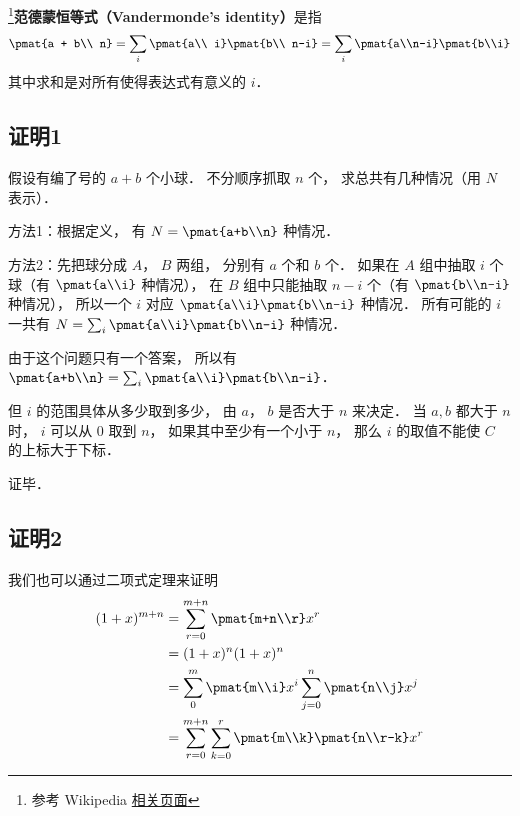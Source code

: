 

\footnote{参考 Wikipedia \href{https://en.wikipedia.org/wiki/Vandermonde's_identity}{相关页面}}\textbf{范德蒙恒等式（Vandermonde's identity）}是指
\begin{equation}
\pmat{a + b\\ n} = \sum_i \pmat{a\\ i} \pmat{b\\ n-i} = \sum\limits_i \pmat{a\\n-i}\pmat{b\\i}
\end{equation}
其中求和是对所有使得表达式有意义的 $i$．

\subsection{证明1}

假设有编了号的 $a+b$ 个小球． 不分顺序抓取 $n$ 个， 求总共有几种情况（用 $N$ 表示）．

方法1：根据定义， 有 $N = \pmat{a+b\\n}$ 种情况．

方法2：先把球分成 $A$，  $B$ 两组， 分别有 $a$ 个和 $b$ 个． 如果在 $A$ 组中抽取 $i$ 个球（有 $\pmat{a\\i}$ 种情况）， 在 $B$ 组中只能抽取  $n - i$ 个（有 $\pmat{b\\n-i}$ 种情况）， 所以一个 $i$ 对应 $\pmat{a\\i} \pmat{b\\n-i}$ 种情况． 所有可能的 $i$ 一共有 $N = \sum_i \pmat{a\\i} \pmat{b\\n-i}$ 种情况．

由于这个问题只有一个答案， 所以有 $\pmat{a+b\\n} = \sum_i \pmat{a\\i} \pmat{b\\n-i}$． 

但 $i$ 的范围具体从多少取到多少， 由 $a$，  $b$ 是否大于 $n$ 来决定． 当 $a,b$ 都大于 $n$ 时， $i$ 可以从 0 取到 $n$，  如果其中至少有一个小于 $n$，  那么 $i$ 的取值不能使 $C$ 的上标大于下标．

证毕．

\subsection{证明2}
我们也可以通过二项式定理来证明
\begin{equation}
\begin{aligned}
(1 + x)^{m+n} &= \sum_{r=0}^{m+n} \pmat{m+n\\r}x^r\\
&=(1+x)^n (1+x)^n\\
&=\sum_0^m \pmat{m\\i}x^i  \sum_{j=0}^n \pmat{n\\j} x^j\\
&=\sum_{r=0}^{m+n} \sum_{k=0}^r \pmat{m\\k} \pmat{n\\r-k} x^r
\end{aligned}
\end{equation}
